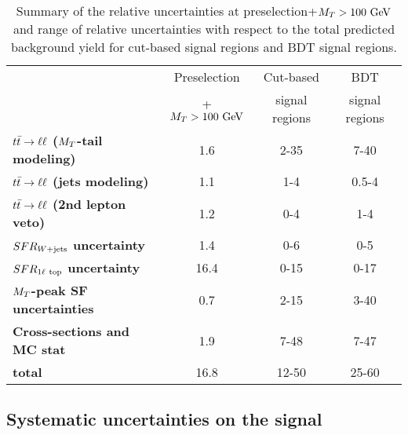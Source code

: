             \begin{table}[!ht]
                \begin{center}
                    \begin{tabular}{|l|c|cc|}
                        \hline
                                                                       & Preselection    & Cut-based      & BDT             \\
                                                                       & + $M_T>100~\text{GeV}$ & signal regions & signal regions  \\
                        \hline
                        \textbf{$t\bar{t} \rightarrow \ell \ell$ ($M_T$-tail modeling)}  & 1.6                      & 2-35         & 7-40    \\
                        \textbf{$t\bar{t} \rightarrow \ell \ell$ (jets modeling)}        & 1.1                      & 1-4          & 0.5-4   \\
                        \textbf{$t\bar{t} \rightarrow \ell \ell$ (2nd lepton veto)}      & 1.2                      & 0-4          & 1-4     \\
                        \textbf{$SFR_{\text{$W$+jets}}$ uncertainty}               & 1.4                      & 0-6          & 0-5     \\
                        \textbf{$SFR_{1\ell~\text{top}}$ uncertainty}        & 16.4                     & 0-15         & 0-17    \\
                        \textbf{$M_T$-peak SF uncertainties}           & 0.7                      & 2-15         & 3-40    \\
                        \textbf{Cross-sections and MC stat}            & 1.9                      & 7-48         & 7-47    \\
                        \hline
                        \textbf{total}                                 & 16.8                     & 12-50        & 25-60   \\
                        \hline
                    \end{tabular}
                    \caption{Summary of the relative uncertainties at preselection+$M_T>100~\text{GeV}$
                    and range of relative uncertainties with respect to the total predicted
                    background yield for cut-based signal regions and BDT signal regions.
                    \label{tab:systematicsSummary}}
                \end{center}
            \end{table}

        \subsection{Systematic uncertainties on the signal}

